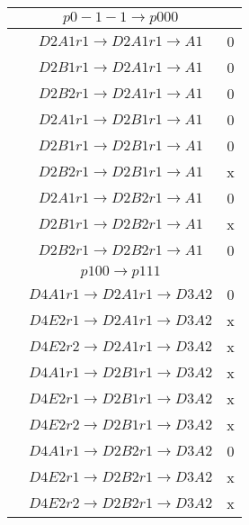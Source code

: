 \documentclass[10pt]{article}
\begin{document}
\begin{table}[!htbp]
\begin{minipage}[!htbp]{0.33\textwidth}
\begin{tabular}{ccc}
\end{tabular}
\end{minipage}
\begin{minipage}[!htbp]{0.33\textwidth}
\begin{tabular}{cc c}
\raggedleft

 &$p0-1-1 \rightarrow p000 $ & \\ \hline
 &  $D2A1 r1 \rightarrow D2A1 r1 \rightarrow A1$ & 0\\
 & $D2B1 r1 \rightarrow D2A1 r1 \rightarrow A1$ &  0\\
 & $D2B2 r1 \rightarrow D2A1 r1 \rightarrow A1$ &  0\\
 & $D2A1 r1 \rightarrow D2B1 r1 \rightarrow A1$ &  0\\
 & $D2B1 r1 \rightarrow D2B1 r1 \rightarrow A1$ &  0\\
 & $D2B2 r1 \rightarrow D2B1 r1 \rightarrow A1$ &  x\\
 & $D2A1 r1 \rightarrow D2B2 r1 \rightarrow A1$ &  0\\
 & $D2B1 r1 \rightarrow D2B2 r1 \rightarrow A1$ &  x\\
 & $D2B2 r1 \rightarrow D2B2 r1 \rightarrow A1$ &  0\\

\hline

 &$p100 \rightarrow p111 $ & \\ \hline
 & $D4A1 r1 \rightarrow D2A1 r1 \rightarrow D3A2$ & 0\\
 & $D4E2 r1 \rightarrow D2A1 r1 \rightarrow D3A2$ &  x\\
 & $D4E2 r2 \rightarrow D2A1 r1 \rightarrow D3A2$ &  x\\
 & $D4A1 r1 \rightarrow D2B1 r1 \rightarrow D3A2$ &  x\\
 & $D4E2 r1 \rightarrow D2B1 r1 \rightarrow D3A2$ &  x\\
 & $D4E2 r2 \rightarrow D2B1 r1 \rightarrow D3A2$ &  x\\
 & $D4A1 r1 \rightarrow D2B2 r1 \rightarrow D3A2$ &  0\\
 & $D4E2 r1 \rightarrow D2B2 r1 \rightarrow D3A2$ &  x\\
 & $D4E2 r2 \rightarrow D2B2 r1 \rightarrow D3A2$ &  x\\

\hline


\end{tabular}
\end{minipage}
\end{table}
\end{document}
